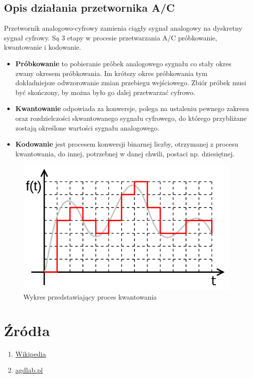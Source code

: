\documentclass[polish,a4paper]{article}
\begin{document}
	\subsection{Opis działania przetwornika A/C}
	 Przetwornik analogowo-cyfrowy zamienia ciągły sygnał analogowy na dyskretny sygnał cyfrowy.
	Są 3 etapy w procesie przetwarzania A/C próbkowanie, kwantowanie i kodowanie.
	\begin{itemize}
		\item \textbf{Próbkowanie} to pobieranie próbek analogowego sygnału co stały okres zwany okresem próbkowania. Im krótszy okres próbkowania tym dokładniejsze odwzorowanie zmian przebiegu wejściowego. Zbiór próbek musi być skończony, by można było go dalej przetwarzać cyfrowo.
		\item \textbf{Kwantowanie} odpowiada za konwersje, polega na ustaleniu pewnego zakresu oraz rozdzielczości skwantowanego sygnału cyfrowego, do którego przybliżane zostają określone wartości sygnału analogowego.
		\item \textbf{Kodowanie} jest procesem konwersji binarnej liczby, otrzymanej z procesu kwantowania, do innej, potrzebnej w danej chwili, postaci np. dziesiętnej.
	\end{itemize}

	\begin{figure}[h!]
		\begin{center}
			\includegraphics[scale=0.45]{Quant.png}
			\caption*{Wykres przedstawiający proces kwantowania}
		\end{center}
	\end{figure}

	\section*{Źródła}
	\begin{enumerate}
		\item \href{https://pl.wikipedia.org/}{Wikipedia}
		\item \href{https://agdlab.pl/slownik/Kwantowanie,171}{agdlab.pl}
	\end{enumerate}
	\begingroup
	\hypersetup{hidelinks}
	\tableofcontents
	\endgroup
\end{document}
